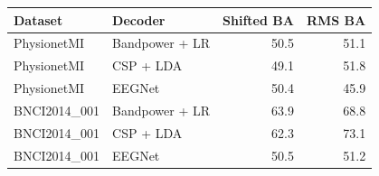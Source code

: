 \begin{tabular}{llrr}
\toprule
Dataset & Decoder & Shifted BA & RMS BA \\
\midrule
PhysionetMI & Bandpower + LR & 50.5 & 51.1 \\
PhysionetMI & CSP + LDA & 49.1 & 51.8 \\
PhysionetMI & EEGNet & 50.4 & 45.9 \\
BNCI2014\_001 & Bandpower + LR & 63.9 & 68.8 \\
BNCI2014\_001 & CSP + LDA & 62.3 & 73.1 \\
BNCI2014\_001 & EEGNet & 50.5 & 51.2 \\
\bottomrule
\end{tabular}
